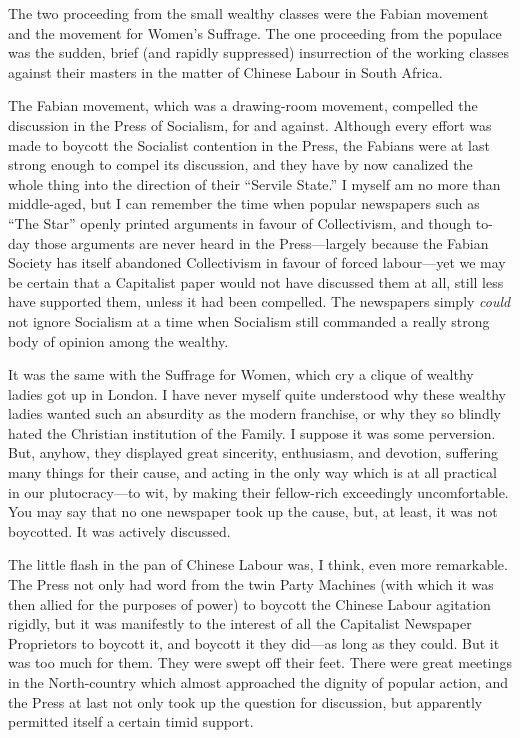 \documentclass{book}
\begin{document}
The two proceeding from the small wealthy classes were the Fabian movement and the movement for Women’s Suffrage. The one proceeding from the populace was the sudden, brief (and rapidly suppressed) insurrection of the working classes against their masters in the matter of Chinese Labour in South Africa.

The Fabian movement, which was a drawing-room movement, compelled the discussion in the Press of Socialism, for and against. Although every effort was made to boycott the Socialist contention in the Press, the Fabians were at last strong enough to compel its discussion, and they have by now canalized the whole thing into the direction of their “Servile State.” I myself am no more than middle-aged, but I can remember the time when popular newspapers such as “The Star” openly printed arguments in favour of Collectivism, and though to-day those arguments are never heard in the Press—largely because the Fabian Society has itself abandoned Collectivism in favour of forced labour—yet we may be certain that a Capitalist paper would not have discussed them at all, still less have supported them, unless it had been compelled. The newspapers simply \emph{could} not ignore Socialism at a time when Socialism still commanded a really strong body of opinion among the wealthy.

It was the same with the Suffrage for Women, which cry a clique of wealthy ladies got up in London. I have never myself quite understood why these wealthy ladies wanted such an absurdity as the modern franchise, or why they so blindly hated the Christian institution of the Family. I suppose it was some perversion. But, anyhow, they displayed great sincerity, enthusiasm, and devotion, suffering many things for their cause, and acting in the only way which is at all practical in our plutocracy—to wit, by making their fellow-rich exceedingly uncomfortable. You may say that no one newspaper took up the cause, but, at least, it was not boycotted. It was actively discussed.

The little flash in the pan of Chinese Labour was, I think, even more remarkable. The Press not only had word from the twin Party Machines (with which it was then allied for the purposes of power) to boycott the Chinese Labour agitation rigidly, but it was manifestly to the interest of all the Capitalist Newspaper Proprietors to boycott it, and boycott it they did—as long as they could. But it was too much for them. They were swept off their feet. There were great meetings in the North-country which almost approached the dignity of popular action, and the Press at last not only took up the question for discussion, but apparently permitted itself a certain timid support.
\end{document}
